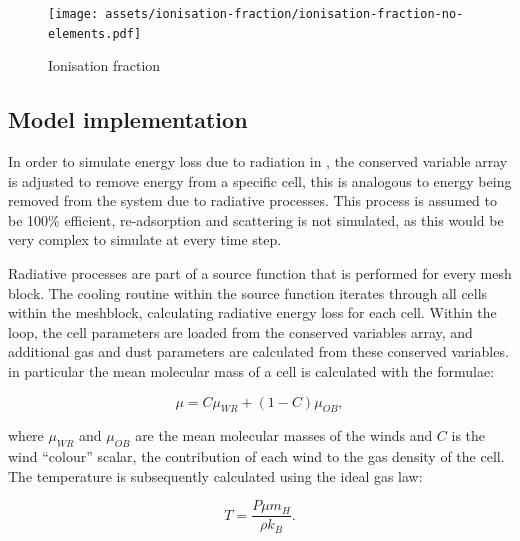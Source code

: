 \begin{figure}
  \centering
  \texttt{[image: assets/ionisation-fraction/ionisation-fraction-no-elements.pdf]}
  \caption[Ionisation fraction for OB and WC stars]{Ionisation fraction}
  \label{fig:electron-curve-no-elements}
\end{figure}



\subsection{Model implementation}
\label{sec:cooling-implementation}

In order to simulate energy loss due to radiation in \athena{}, the conserved variable array is adjusted to remove energy from a specific cell, this is analogous to energy being removed from the system due to radiative processes.
This process is assumed to be 100\% efficient, re-adsorption and scattering is not simulated, as this would be very complex to simulate at every time step.


Radiative processes are part of a source function that is performed for every mesh block.
The cooling routine within the source function iterates through all cells within the meshblock, calculating radiative energy loss for each cell.
Within the loop, the cell parameters are loaded from the conserved variables array, and additional gas and dust parameters are calculated from these conserved variables.
in particular the mean molecular mass of a cell is calculated with the formulae:

\begin{equation}
  \mu = C\mu_{WR} + (1-C) \mu_{OB}, \label{eq:windaveraging}
\end{equation}

\noindent
where $\mu_{WR}$ and $\mu_{OB}$ are the mean molecular masses of the winds and $C$ is the wind ``colour'' scalar, the contribution of each wind to the gas density of the cell.
The temperature is subsequently calculated using the ideal gas law:

\begin{equation}
  T = \frac{P \mu m_H}{\rho k_B}.
\end{equation}

